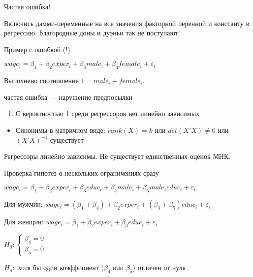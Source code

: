 \documentclass[russian,ignorenonframetext,]{beamer}
\providecommand{\tightlist}{%
  \setlength{\itemsep}{0pt}\setlength{\parskip}{0pt}}
\begin{document}
\begin{frame}{Частая ошибка!}

Включить дамми-переменные на все значения факторной перенной и константу
в регрессию. Благородные доны и дуэньи так не поступают!

Пример с ошибкой (!).

\(wage_i = \beta_1 + \beta_2 exper_i + \beta_3 male_i + \beta_4 female_i +\varepsilon_i\)

Выполнено соотношение \(1 = male_i + female_i\).

\end{frame}

\begin{frame}{частая ошибка --- нарушение предпосылки}

\begin{enumerate}
\def\labelenumi{\arabic{enumi}.}
\setcounter{enumi}{7}
\tightlist
\item
  С вероятностью 1 среди регрессоров нет линейно зависимых
\end{enumerate}

\begin{itemize}
\tightlist
\item
  Синонимы в матричном виде: \(rank(X)=k\) или \(det(X'X)\neq 0\) или
  \((X'X)^{-1}\) существует
\end{itemize}

Регрессоры линейно зависимы. Не существует единственных оценок МНК.

\end{frame}

\begin{frame}{Проверка гипотез о нескольких ограничениях сразу}

\(wage_i = \beta_1 + \beta_2 exper_i + \beta_3 educ_i + \beta_4 male_i + \beta_5 male_i educ_i + \varepsilon_i\)

Для мужчин:
\(wage_i = (\beta_1+\beta_4) + \beta_2 exper_i + (\beta_3 + \beta_5) educ_i + \varepsilon_i\)

Для женщин:
\(wage_i = \beta_1 + \beta_2 exper_i + \beta_3 educ_i + \varepsilon_i\)

\(H_0: \begin{cases} \beta_4 = 0 \\ \beta_5 = 0 \end{cases}\)

\(H_a:\) хотя бы один коэффициент (\(\beta_4\) или \(\beta_5\)) отличен
от нуля

\end{frame}
\end{document}
